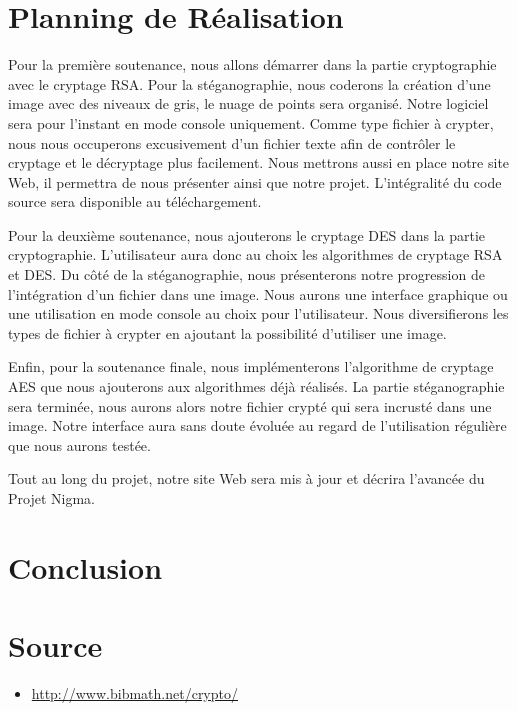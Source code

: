 \documentclass[a4paper,12pt]{article}
\begin{document}
\newpage

\part{Planning de Réalisation}
Pour la première soutenance, nous allons démarrer dans la partie cryptographie avec le cryptage RSA. Pour la stéganographie, nous coderons la création d'une image avec des niveaux de gris, le nuage de points sera organisé. Notre logiciel sera pour l'instant en mode console uniquement. Comme type fichier à crypter, nous nous occuperons excusivement d'un fichier texte afin de contrôler le cryptage et le décryptage plus facilement. Nous mettrons aussi en place notre site Web, il permettra de nous présenter ainsi que notre projet. L'intégralité du code source sera disponible au téléchargement.

Pour la deuxième soutenance, nous ajouterons le cryptage DES dans la partie cryptographie. L'utilisateur aura donc au choix les algorithmes de cryptage RSA et DES. Du côté de la stéganographie, nous présenterons notre progression de l'intégration d'un fichier dans une image. Nous aurons une interface graphique ou une utilisation en mode console au choix pour l'utilisateur. Nous diversifierons les types de fichier à crypter en ajoutant la possibilité d'utiliser une image.

Enfin, pour la soutenance finale, nous implémenterons l'algorithme de cryptage AES que nous ajouterons aux algorithmes déjà réalisés. La partie stéganographie sera terminée, nous aurons alors notre fichier crypté qui sera incrusté dans une image. Notre interface aura sans doute évoluée au regard de l'utilisation régulière que nous aurons testée.

Tout au long du projet, notre site Web sera mis à jour et décrira l'avancée du Projet Nigma.
\newpage

\part{Conclusion}

\newpage

\part*{Source}

\begin{itemize}
\item \href{http://www.bibmath.net/crypto/}{http://www.bibmath.net/crypto/}
\end{itemize}
\end{document}
